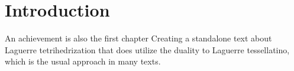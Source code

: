 \chapter*{Introduction}

An achievement is also the first chapter
Creating a standalone text about Laguerre tetrihedrization that does utilize the duality to Laguerre tessellatino, which is the usual approach in many texts. 

